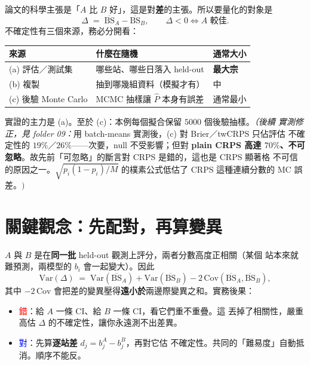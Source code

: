 \documentclass[12pt]{article}
\newcommand{\BS}{\mathrm{BS}}
\newcommand{\Phat}{\widehat{P}}
\begin{document}
論文的科學主張是「$A$ 比 $B$ 好」，這是對\textbf{差}的主張。所以要量化的對象是
\begin{equation}
  \Delta \;=\; \overline{\BS}_A - \overline{\BS}_B ,
  \qquad \Delta < 0 \iff A \text{ 較佳.}
  \label{eq:delta}
\end{equation}
不確定性有三個來源，務必分開看：
\begin{center}
\begin{tabular}{@{}p{3.4cm}p{7.2cm}p{2.3cm}@{}}
\toprule
來源 & 什麼在隨機 & 通常大小 \\
\midrule
(a) 評估／測試集 & 哪些站、哪些日落入 held-out & \textbf{最大宗} \\
(b) 複製 & 抽到哪幾組資料（模擬才有） & 中 \\
(c) 後驗 Monte Carlo & MCMC 抽樣讓 $\Phat$ 本身有誤差 & 通常最小 \\
\bottomrule
\end{tabular}
\end{center}
實證的主力是 (a)。至於 (c)：本例每個擬合保留 $5000$ 個後驗抽樣。\emph{（後續
實測修正，見 folder 09：}用 batch-means 實測後，(c) 對 Brier／twCRPS 只佔評估
不確定性的 $19\%$／$26\%$——次要，null 不受影響；但對 \textbf{plain CRPS 高達
$70\%$、不可忽略}。故先前「可忽略」的斷言對 CRPS 是錯的，這也是 CRPS 顯著格
不可信的原因之一。$\sqrt{p_i(1-p_i)/M}$ 的樸素公式低估了 CRPS 這種連續分數的
MC 誤差。$)$

\section{關鍵觀念：先配對，再算變異}

$A$ 與 $B$ 是在\textbf{同一批} held-out 觀測上評分，兩者分數高度正相關（某個
站本來就難預測，兩模型的 $b_i$ 會一起變大）。因此
\begin{equation}
  \mathrm{Var}(\Delta)
  \;=\; \mathrm{Var}(\overline{\BS}_A) + \mathrm{Var}(\overline{\BS}_B)
        - 2\,\mathrm{Cov}(\overline{\BS}_A, \overline{\BS}_B) ,
  \label{eq:varDelta}
\end{equation}
其中 $-2\,\mathrm{Cov}$ 會把差的變異壓得\textbf{遠小於}兩邊際變異之和。實務後果：
\begin{itemize}
  \item \textcolor{red}{錯}：給 $A$ 一條 CI、給 $B$ 一條 CI，看它們重不重疊。這
        丟掉了相關性，嚴重高估 $\Delta$ 的不確定性，讓你永遠測不出差異。
  \item \textcolor{blue}{對}：先算\textbf{逐站差} $d_j = b^A_j - b^B_j$，再對它估
        不確定性。共同的「難易度」自動抵消。順序不能反。
\end{itemize}
\end{document}
